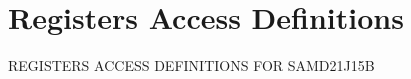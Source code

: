 \hypertarget{group___s_a_m_d21_j15_b__reg}{}\section{Registers Access Definitions}
\label{group___s_a_m_d21_j15_b__reg}
R\+E\+G\+I\+S\+T\+E\+RS A\+C\+C\+E\+SS D\+E\+F\+I\+N\+I\+T\+I\+O\+NS F\+OR S\+A\+M\+D21\+J15B 